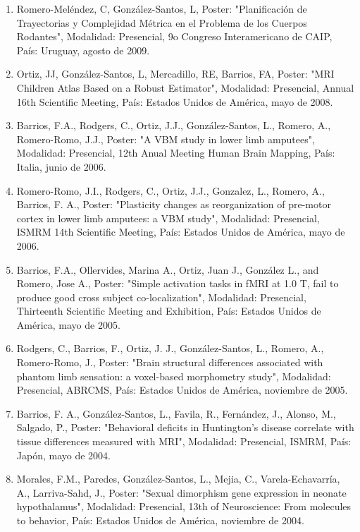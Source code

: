 \begin{enumerate}
\item Romero-Meléndez, C, González-Santos, L, Poster: "Planificación de Trayectorias y Complejidad Métrica en el Problema de 
los Cuerpos Rodantes", Modalidad: Presencial, 9o Congreso Interamericano de CAIP, País: Uruguay, agosto de 2009.

\item Ortiz, JJ, González-Santos, L, Mercadillo, RE, Barrios, FA, Poster: "MRI Children Atlas Based on a Robust Estimator", 
Modalidad: Presencial, Annual 16th Scientific Meeting, País: Estados Unidos de América, mayo de 2008.

\item Barrios, F.A., Rodgers, C., Ortiz, J.J., González-Santos, L., Romero, A., Romero-Romo, J.J., Poster: "A VBM study in lower limb amputees", 
Modalidad: Presencial, 12th Anual Meeting Human Brain 
Mapping, País: Italia, junio de 2006.

\item Romero-Romo, J.I., Rodgers, C., Ortiz, J.J., Gonzalez, L., Romero, A., Barrios, F. A., Poster: "Plasticity changes as 
reorganization of pre-motor cortex in lower limb amputees: a VBM study", Modalidad: Presencial, ISMRM 14th Scientific 
Meeting, País: Estados Unidos de América, mayo de 2006.

\item Barrios, F.A., Ollervides, Marina A., Ortiz, Juan J., González L., and Romero, Jose A., Poster: "Simple activation 
tasks in fMRI at 1.0 T, fail to produce good cross subject co-localization", Modalidad: Presencial, Thirteenth Scientific 
Meeting and Exhibition, País: Estados Unidos de América, mayo de 2005.

\item Rodgers, C., Barrios, F., Ortiz, J. J., González-Santos, L., Romero, A., Romero-Romo, J., Poster: "Brain structural 
differences associated with phantom limb sensation: a voxel-based morphometry study", Modalidad: Presencial, ABRCMS, País: 
Estados Unidos de América, noviembre de 2005.

\item Barrios, F. A., González-Santos, L., Favila, R., Fernández, J., Alonso, M., Salgado, P., Poster: "Behavioral deficits 
in Huntington’s disease correlate with tissue differences measured with MRI", Modalidad: Presencial, ISMRM, País: Japón, 
mayo de 2004.

\item Morales, F.M., Paredes, González-Santos, L., Mejia, C., Varela-Echavarría, A., Larriva-Sahd, J., Poster: "Sexual 
dimorphism gene expression in neonate hypothalamus", Modalidad: Presencial, 13th of Neuroscience: From molecules to 
behavior, País: Estados Unidos de América, noviembre de 2004.


\end{enumerate}
